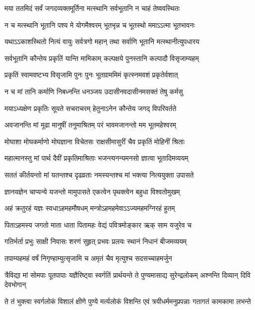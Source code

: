 \twolineshloka
{मया ततमिदं सर्वं जगदव्यक्तमूर्तिना}
{मत्स्थानि सर्वभूतानि न चाहं तेष्ववस्थितः}%

\twolineshloka
{न च मत्स्थानि भूतानि पश्य मे योगमैश्वरम्}
{भूतभृन्न च भूतस्थो ममाऽऽत्मा भूतभावनः}%

\twolineshloka
{यथाऽऽकाशस्थितो नित्यं वायुः सर्वत्रगो महान्}
{तथा सर्वाणि भूतानि मत्स्थानीत्युपधारय}%

\twolineshloka
{सर्वभूतानि कौन्तेय प्रकृतिं यान्ति मामिकाम्}
{कल्पक्षये पुनस्तानि कल्पादौ विसृजाम्यहम्}%

\twolineshloka
{प्रकृतिं स्वामवष्टभ्य विसृजामि पुनः पुनः}
{भूतग्राममिमं कृत्स्नमवशं प्रकृतेर्वशात्}%

\twolineshloka
{न च मां तानि कर्माणि निबध्नन्ति धनञ्जय}
{उदासीनवदासीनमसक्तं तेषु कर्मसु}%

\twolineshloka
{मयाऽध्यक्षेण प्रकृतिः सूयते सचराचरम्}
{हेतुनाऽनेन कौन्तेय जगद् विपरिवर्तते}%

\twolineshloka
{अवजानन्ति मां मूढा मानुषीं तनुमाश्रितम्}
{परं भावमजानन्तो मम भूतमहेश्वरम्}%

\twolineshloka
{मोघाशा मोघकर्माणो मोघज्ञाना विचेतसः}
{राक्षसीमासुरीं चैव प्रकृतिं मोहिनीं श्रिताः}%

\twolineshloka
{महात्मानस्तु मां पार्थ दैवीं प्रकृतिमाश्रिताः}
{भजन्त्यनन्यमनसो ज्ञात्वा भूतादिमव्ययम्}%

\twolineshloka
{सततं कीर्तयन्तो मां यतन्तश्च दृढव्रताः}
{नमस्यन्तश्च मां भक्त्या नित्ययुक्ता उपासते}%

\twolineshloka
{ज्ञानयज्ञेन चाप्यन्ये यजन्तो मामुपासते}
{एकत्वेन पृथक्त्वेन बहुधा विश्वतोमुखम्}%

\twolineshloka
{अहं क्रतुरहं यज्ञः स्वधाऽहमहमौषधम्}
{मन्त्रोऽहमहमेवाऽऽज्यमहमग्निरहं हुतम्}%

\twolineshloka
{पिताऽहमस्य जगतो माता धाता पितामहः}
{वेद्यं पवित्रमोङ्कार ऋक् साम यजुरेव च}%

\twolineshloka
{गतिर्भर्ता प्रभुः साक्षी निवासः शरणं सुहृत्}
{प्रभवः प्रलयः स्थानं निधानं बीजमव्ययम्}%

\twolineshloka
{तपाम्यहमहं वर्षं निगृण्हाम्युत्सृजामि च}
{अमृतं चैव मृत्युश्च सदसच्चाहमर्जुन}%

\fourlineindentedshloka
{त्रैविद्या मां सोमपाः पूतपापाः}
{यज्ञैरिष्ट्वा स्वर्गतिं प्रार्थयन्ते}
{ते पुण्यमासाद्य सुरेन्द्रलोकम्}
{अश्नन्ति दिव्यान् दिवि देवभोगान्}%

\fourlineindentedshloka
{ते तं भुक्त्वा स्वर्गलोकं विशालं}
{क्षीणे पुण्ये मर्त्यलोकं विशन्ति}
{एवं त्रयीधर्ममनुप्रपन्नाः}
{गतागतं कामकामा लभन्ते}%

